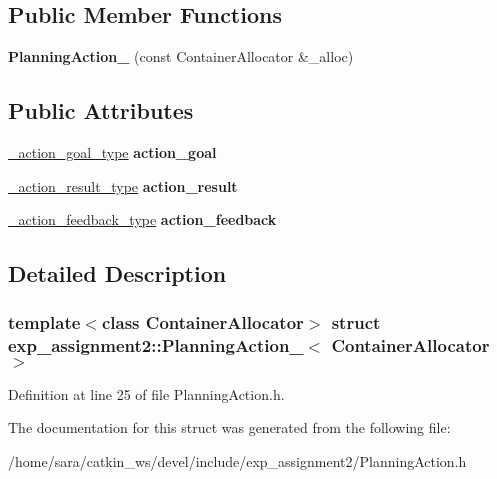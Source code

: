 \subsection*{Public Member Functions}
\begin{DoxyCompactItemize}
\item 
\mbox{\label{structexp__assignment2_1_1PlanningAction___a5872e8b8d8e3081d63655e904fc21a9f}} 
{\bfseries Planning\+Action\+\_\+} (const Container\+Allocator \&\+\_\+alloc)
\end{DoxyCompactItemize}
\subsection*{Public Attributes}
\begin{DoxyCompactItemize}
\item 
\mbox{\label{structexp__assignment2_1_1PlanningAction___ac3e7227f3174e913b410f3c5c1ebbf16}} 
\hyperlink{structexp__assignment2_1_1PlanningActionGoal__}{\+\_\+action\+\_\+goal\+\_\+type} {\bfseries action\+\_\+goal}
\item 
\mbox{\label{structexp__assignment2_1_1PlanningAction___a3aac4cda4ce2fd999fda2ddbb6e5ff4f}} 
\hyperlink{structexp__assignment2_1_1PlanningActionResult__}{\+\_\+action\+\_\+result\+\_\+type} {\bfseries action\+\_\+result}
\item 
\mbox{\label{structexp__assignment2_1_1PlanningAction___aaa371c1c036320e03f4762a7f023b521}} 
\hyperlink{structexp__assignment2_1_1PlanningActionFeedback__}{\+\_\+action\+\_\+feedback\+\_\+type} {\bfseries action\+\_\+feedback}
\end{DoxyCompactItemize}


\subsection{Detailed Description}
\subsubsection*{template$<$class Container\+Allocator$>$\newline
struct exp\+\_\+assignment2\+::\+Planning\+Action\+\_\+$<$ Container\+Allocator $>$}



Definition at line 25 of file Planning\+Action.\+h.



The documentation for this struct was generated from the following file\+:\begin{DoxyCompactItemize}
\item 
/home/sara/catkin\+\_\+ws/devel/include/exp\+\_\+assignment2/Planning\+Action.\+h\end{DoxyCompactItemize}

